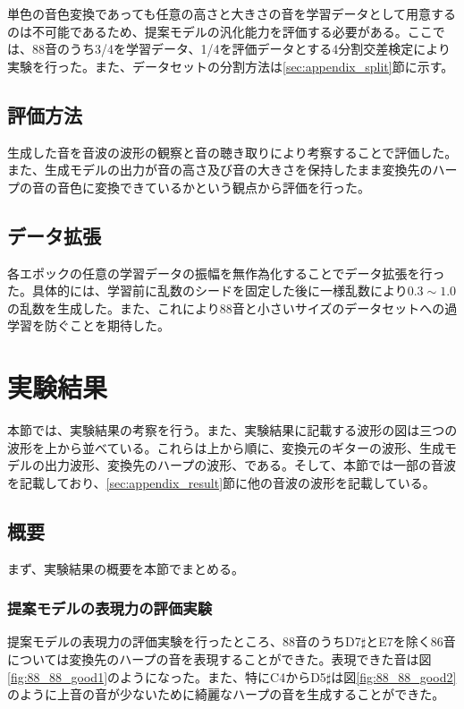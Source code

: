 単色の音色変換であっても任意の高さと大きさの音を学習データとして用意するのは不可能であるため、提案モデルの汎化能力を評価する必要がある。ここでは、88音のうち3/4を学習データ、1/4を評価データとする4分割交差検定により実験を行った。また、データセットの分割方法は\ref{sec:appendix_split}節に示す。

\subsection{評価方法}

生成した音を音波の波形の観察と音の聴き取りにより考察することで評価した。また、生成モデルの出力が音の高さ及び音の大きさを保持したまま変換先のハープの音の音色に変換できているかという観点から評価を行った。

\subsection{データ拡張}

各エポックの任意の学習データの振幅を無作為化することでデータ拡張を行った。具体的には、学習前に乱数のシードを固定した後に一様乱数により$0.3\sim1.0$の乱数を生成した。また、これにより88音と小さいサイズのデータセットへの過学習を防ぐことを期待した。

\clearpage

\section{実験結果}
\label{result}

本節では、実験結果の考察を行う。また、実験結果に記載する波形の図は三つの波形を上から並べている。これらは上から順に、変換元のギターの波形、生成モデルの出力波形、変換先のハープの波形、である。そして、本節では一部の音波を記載しており、\ref{sec:appendix_result}節に他の音波の波形を記載している。

\subsection{概要}

まず、実験結果の概要を本節でまとめる。

\subsubsection{提案モデルの表現力の評価実験}

提案モデルの表現力の評価実験を行ったところ、88音のうちD7$\sharp$とE7を除く86音については変換先のハープの音を表現することができた。表現できた音は図\ref{fig:88_88_good1}のようになった。また、特にC4からD5$\sharp$は図\ref{fig:88_88_good2}のように上音の音が少ないために綺麗なハープの音を生成することができた。


